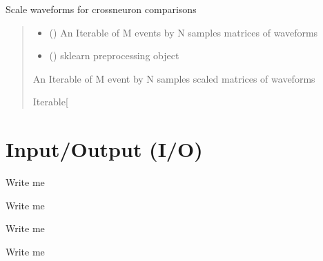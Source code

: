 \documentclass[letterpaper,10pt,english]{sphinxmanual}
\begin{document}

\begin{fulllineitems}
\label{\detokenize{CalSciPy.event_processing:CalSciPy.event_processing.scale_waveforms}}
\pysigstartsignatures
{}
\pysigstopsignatures
\sphinxAtStartPar
Scale waveforms for cross\sphinxhyphen{}neuron comparisons
\begin{quote}\begin{description}
\begin{itemize}
\item {} 
\sphinxAtStartPar
{} () \textendash{} An Iterable of M events by N samples matrices of waveforms

\item {} 
\sphinxAtStartPar
{} () \textendash{} sklearn preprocessing object

\end{itemize}

\sphinxAtStartPar
An Iterable of M event by N samples scaled matrices of waveforms

\sphinxAtStartPar
Iterable{[}\sphinxhref{https://numpy.org/doc/1.24/reference/generated/numpy.ndarray.html\#numpy.ndarray}{numpy.ndarray}{]}

\end{description}\end{quote}

\end{fulllineitems}



\section{Input/Output (I/O)}
\label{\detokenize{Sub-Packages:input-output-i-o}}\label{\detokenize{Sub-Packages:io-module}}
\begin{DUlineblock}{0em}
\item[] Write me
\item[] Write me
\item[] Write me
\item[] Write me
\end{DUlineblock}
\end{document}
